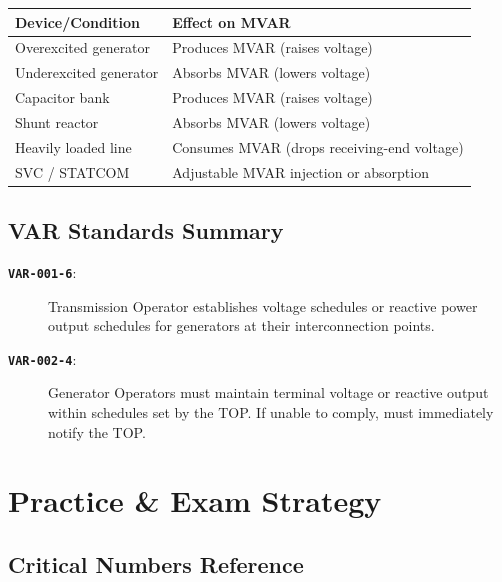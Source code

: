 \documentclass[12pt,twoside,openright]{memoir}
\newcommand{\std}[1]{\texttt{\textbf{#1}}}
\begin{document}
\begin{center}
\begin{tabular}{@{}ll@{}}
\toprule
\rowcolor{nercblue!15}
\textbf{Device/Condition} & \textbf{Effect on MVAR} \\
\midrule
Overexcited generator & Produces MVAR (raises voltage) \\
\rowcolor{rowlight}
Underexcited generator & Absorbs MVAR (lowers voltage) \\
Capacitor bank & Produces MVAR (raises voltage) \\
\rowcolor{rowlight}
Shunt reactor & Absorbs MVAR (lowers voltage) \\
Heavily loaded line & Consumes MVAR (drops receiving-end voltage) \\
\rowcolor{rowlight}
SVC / STATCOM & Adjustable MVAR injection or absorption \\
\bottomrule
\end{tabular}
\end{center}

\section{VAR Standards Summary}

\begin{description}
  \item[\std{VAR-001-6}:] Transmission Operator establishes voltage schedules or
        reactive power output schedules for generators at their interconnection points.
  \item[\std{VAR-002-4}:] Generator Operators must maintain terminal voltage or reactive
        output within schedules set by the TOP. If unable to comply, must immediately notify the TOP.
\end{description}

\chapter{Practice \& Exam Strategy}
\label{ch:lab}

\section{Critical Numbers Reference}
\end{document}
